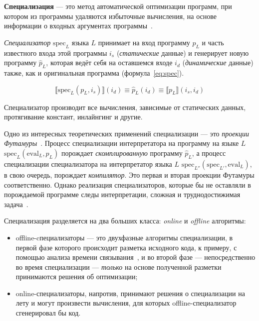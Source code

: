 {\bf Специализация} --- это метод автоматической оптимизации программ,
при котором из программы удаляются избыточные вычисления,
на основе информации о входных аргументах программы~\cite{jones}.


{\it Специализатор} $\text{spec}_L$ языка $L$ принимает на вход программу $p_L$ и часть известного входа этой
программы $i_s$ (\emph{статические} данные) и генерирует новую программу $\hat{p}_L$, которая ведёт себя на оставшемся
входе $i_d$ (\emph{динамические} данные) также, как и оригинальная программа (формула~\ref{eq:spec}).

\begin{equation}
  \llbracket \text{spec}_L(p_L, i_s) \rrbracket (i_d) \equiv \hat{p}_L (i_d) \equiv \llbracket p_L \rrbracket (i_s, i_d)
\label{eq:spec}
\end{equation}

Специализатор производит все вычисления, зависимые от статических данных,
протягивание констант, инлайнгинг и другие.

Одно из интересных теоретических применений специализации --- это
\emph{проекции Футамуры}~\cite{futamura}. Процесс специализации интерпретатора
на программу на языке $L$ $\text{spec}_L(\text{eval}_L, p_L)$
порождает \emph{скомплированную} программу $\hat{p}_L$, а процесс специализации
специализатора на интерпретатор языка $L$
$\text{spec}_{L''}(\text{spec}_{L'}, \text{eval}_L)$, в свою очередь,
порождает \emph{компилятор}. Это первая и вторая проекции Футамуры
соответственно. Однако реализация специализаторов, которые бы не оставляли
в порождаемой программе следы интерпретации, сложная и труднодостижимая
задача~\cite{jones}.

Специализация разделяется на два больших класса: \emph{online} и \emph{offline}
алгоритмы:
\begin{itemize}
\item offline-cпециализаторы --- это двухфазные алгоритмы специализации,
     в первой фазе которого происходит разметка исходного кода, к примеру,
     с помощью анализа времени связывания~\cite{jones}, и во второй
     фазе --- непосредственно во время специализации --- \emph{только}
     на основе полученной разметки принимаются решения об оптимизации;
\item online-специализаторы, напротив, принимают решения о специализации
      на лету и могут произвести вычисления, для которых offline-специализатор сгенерировал
      бы код.
\end{itemize}


